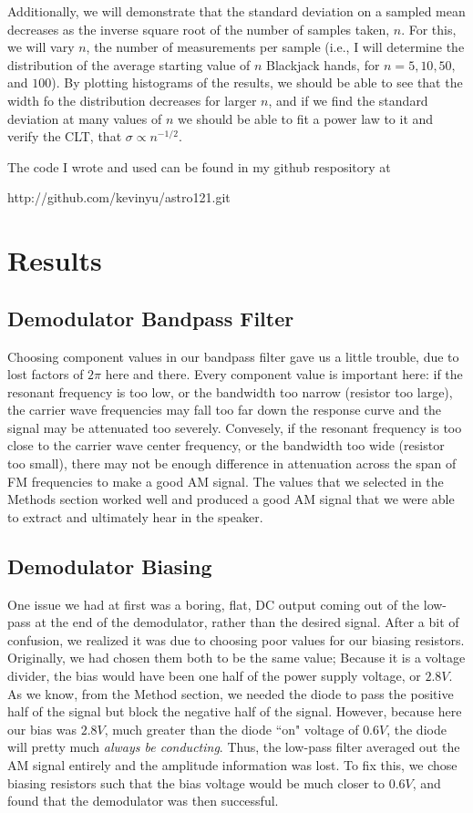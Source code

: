 \documentclass[12pt]{article}
\begin{document}
Additionally, we will demonstrate that the standard deviation on a sampled mean decreases as the inverse square root of the number of samples taken, $n$. For this, we will vary $n$, the number of measurements per sample (i.e., I will determine the distribution of the average starting value of $n$ Blackjack hands, for $n=5,10,50,$ and $100$). By plotting histograms of the results, we should be able to see that the width fo the distribution decreases for larger $n$, and if we find the standard deviation at many values of $n$ we should be able to fit a power law to it and verify the CLT, that $\sigma \propto n^{-1/2}$.

The code I wrote and used can be found in my github respository at

 http://github.com/kevinyu/astro121.git

\section*{Results}
\subsection*{Demodulator Bandpass Filter}
Choosing component values in our bandpass filter gave us a little trouble, due to lost factors of $2\pi$ here and there. Every component value is important here: if the resonant frequency is too low, or the bandwidth too narrow (resistor too large), the carrier wave frequencies may fall too far down the response curve and the signal may be attenuated too severely. Convesely, if the resonant frequency is too close to the carrier wave center frequency, or the bandwidth too wide (resistor too small), there may not be enough difference in attenuation across the span of FM frequencies to make a good AM signal. The values that we selected in the Methods section worked well and produced a good AM signal that we were able to extract and ultimately hear in the speaker.  
\subsection*{Demodulator Biasing}
One issue we had at first was a boring, flat, DC output coming out of the low-pass at the end of the demodulator, rather than the desired signal. After a bit of confusion, we realized it was due to choosing poor values for our biasing resistors. Originally, we had chosen them both to be the same value; Because it is a voltage divider, the bias would have been one half of the power supply voltage, or $2.8V$. As we know, from the Method section, we needed the diode to pass the positive half of the signal but block the negative half of the signal. However, because here our bias was $2.8V$, much greater than the diode ``on" voltage of $0.6V$, the diode will pretty much \textit{always be conducting}. Thus, the low-pass filter averaged out the AM signal entirely and the amplitude information was lost. To fix this, we chose biasing resistors such that the bias voltage would be much closer to $0.6V$, and found that the demodulator was then successful.
\end{document}
